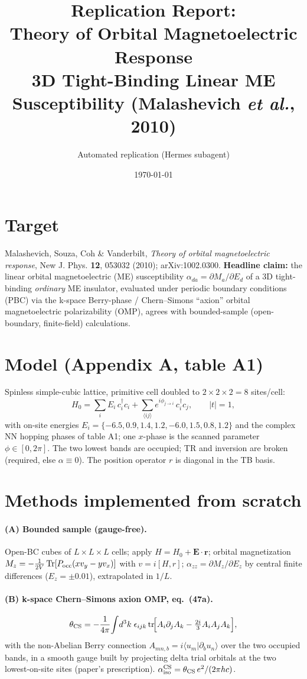 \documentclass[11pt]{article}
\title{Replication Report: \\ Theory of Orbital Magnetoelectric Response \\ \large 3D Tight-Binding Linear ME Susceptibility (Malashevich \emph{et al.}, 2010)}
\author{Automated replication (Hermes subagent)}
\date{\today}
\begin{document}
\maketitle

\section{Target}
Malashevich, Souza, Coh \& Vanderbilt, \emph{Theory of orbital magnetoelectric
response}, New J. Phys. \textbf{12}, 053032 (2010); arXiv:1002.0300.
\textbf{Headline claim:} the linear orbital magnetoelectric (ME) susceptibility
$\alpha_{da}=\partial M_a/\partial E_d$ of a 3D tight-binding \emph{ordinary} ME
insulator, evaluated under periodic boundary conditions (PBC) via the k-space
Berry-phase / Chern--Simons ``axion'' orbital magnetoelectric polarizability
(OMP), agrees with bounded-sample (open-boundary, finite-field) calculations.

\section{Model (Appendix A, table A1)}
Spinless simple-cubic lattice, primitive cell doubled to $2\times2\times2=8$
sites/cell:
\[
H_0=\sum_i E_i\,c_i^\dagger c_i+\sum_{\langle ij\rangle} e^{i\phi_{j\to i}}\,c_i^\dagger c_j,\qquad |t|=1,
\]
with on-site energies $E_i=\{-6.5,0.9,1.4,1.2,-6.0,1.5,0.8,1.2\}$ and the complex
NN hopping phases of table A1; one $x$-phase is the scanned parameter
$\phi\in[0,2\pi]$. The two lowest bands are occupied; TR and inversion are broken
(required, else $\alpha\equiv0$). The position operator $r$ is diagonal in the TB basis.

\section{Methods implemented from scratch}
\paragraph{(A) Bounded sample (gauge-free).} Open-BC cubes of $L\times L\times L$
cells; apply $H=H_0+\mathbf E\cdot\mathbf r$; orbital magnetization
$M_z=-\tfrac{1}{2V}\,\mathrm{Tr}[P_{\rm occ}(x v_y - y v_x)]$ with $v=i[H,r]$;
$\alpha_{zz}=\partial M_z/\partial E_z$ by central finite differences
($E_z=\pm0.01$), extrapolated in $1/L$.
\paragraph{(B) k-space Chern--Simons axion OMP, eq.~(47a).}
\[
\theta_{\rm CS}=-\frac{1}{4\pi}\!\int\! d^3k\;\epsilon_{ijk}\,
\mathrm{tr}\!\Big[A_i\partial_j A_k-\tfrac{2i}{3}A_iA_jA_k\Big],
\]
with the non-Abelian Berry connection $A_{mn,b}=i\langle u_m|\partial_b u_n\rangle$
over the two occupied bands, in a smooth gauge built by projecting delta trial
orbitals at the two lowest-on-site sites (paper's prescription).
$\alpha^{\rm CS}_{\rm iso}=\theta_{\rm CS}\,e^2/(2\pi hc)$.
\end{document}
